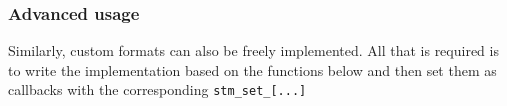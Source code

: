 \documentclass[english]{aghengthesis} %
\begin{document}

\subsubsection{Advanced usage}
Similarly, custom formats can also be freely implemented. All that is required is to write the implementation based on the functions below and then set them as callbacks with the corresponding \texttt{stm\_set\_[...]}
\end{document}

